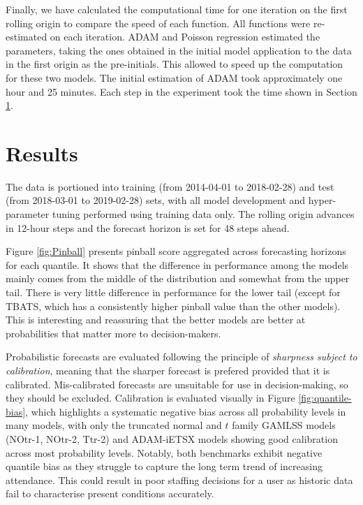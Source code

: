 \documentclass[]{elsarticle} %
\begin{document}
Finally, we have calculated the computational time for one iteration on the first rolling origin to compare the speed of each function. All functions were re-estimated on each iteration. ADAM and Poisson regression estimated the parameters, taking the ones obtained in the initial model application to the data in the first origin as the pre-initials. This allowed to speed up the computation for these two models. The initial estimation of ADAM took approximately one hour and 25 minutes. Each step in the experiment took the time shown in Section \ref{result}.

\hypertarget{result}{%
\section{Results}\label{result}}

The data is portioned into training (from 2014-04-01 to 2018-02-28) and test (from 2018-03-01 to 2019-02-28) sets, with all model development and hyper-parameter tuning performed using training data only. The rolling origin advances in 12-hour steps and the forecast horizon is set for 48 steps ahead.

Figure \ref{fig:Pinball} presents pinball score aggregated across forecasting horizons for each quantile. It shows that the difference in performance among the models mainly comes from the middle of the distribution and somewhat from the upper tail. There is very little difference in performance for the lower tail (except for TBATS, which has a consistently higher pinball value than the other models). This is interesting and reassuring that the better models are better at probabilities that matter more to decision-makers.

Probabilistic forecasts are evaluated following the principle of \emph{sharpness subject to calibration}, meaning that the sharper forecast is prefered provided that it is calibrated. Mis-calibrated forecasts are unsuitable for use in decision-making, so they should be excluded. Calibration is evaluated visually in Figure \ref{fig:quantile-bias}, which highlights a systematic negative bias across all probability levels in many models, with only the truncated normal and \(t\) family GAMLSS models (NOtr-1, NOtr-2, Ttr-2) and ADAM-iETSX models showing good calibration across most probability levels. Notably, both benchmarks exhibit negative quantile bias as they struggle to capture the long term trend of increasing attendance. This could result in poor staffing decisions for a user as historic data fail to characterise present conditions accurately.
\end{document}

